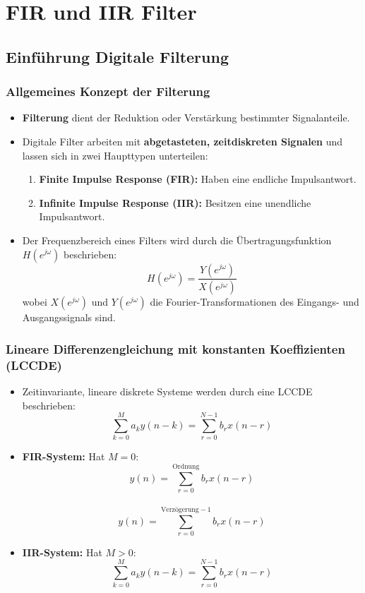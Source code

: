 \documentclass[12pt]{article}
\begin{document}
\newpage
\section{FIR und IIR Filter}
   \subsection{Einführung Digitale Filterung}
   \subsubsection{Allgemeines Konzept der Filterung}
      \begin{itemize}
         \item \textbf{Filterung} dient der Reduktion oder Verstärkung bestimmter Signalanteile.
         \item Digitale Filter arbeiten mit \textbf{abgetasteten, zeitdiskreten Signalen} und lassen sich in zwei Haupttypen unterteilen:
         \begin{enumerate}
            \item \textbf{Finite Impulse Response (FIR):} Haben eine endliche Impulsantwort.
            \item \textbf{Infinite Impulse Response (IIR):} Besitzen eine unendliche Impulsantwort.
         \end{enumerate}
         \item Der Frequenzbereich eines Filters wird durch die Übertragungsfunktion \(H(e^{j\omega})\) beschrieben:
         \[
            H(e^{j\omega}) = \frac{Y(e^{j\omega})}{X(e^{j\omega})}
         \]
         wobei \(X(e^{j\omega})\) und \(Y(e^{j\omega})\) die Fourier-Transformationen des Eingangs- und Ausgangssignals sind.
      \end{itemize}

   \smallskip

   \subsubsection{Lineare Differenzengleichung mit konstanten Koeffizienten (LCCDE)}
      \begin{itemize}
         \item Zeitinvariante, lineare diskrete Systeme werden durch eine LCCDE beschrieben:
         \[
            \sum_{k=0}^{M} a_k y(n-k) = \sum_{r=0}^{N-1} b_r x(n-r)
         \]
         \item \textbf{FIR-System:} Hat \(M = 0\):
         \[
            y(n) = \sum_{r=0}^{\text{Ordnung}} b_r x(n-r)
         \] \\[5pt]
         \[
            y(n) = \sum_{r=0}^{\text{Verzögerung} - 1} b_r x(n-r)
         \]
         \item \textbf{IIR-System:} Hat \(M > 0\):
         \[
            \sum_{k=0}^{M} a_k y(n-k) = \sum_{r=0}^{N-1} b_r x(n-r)
         \]
      \end{itemize}
\end{document}
